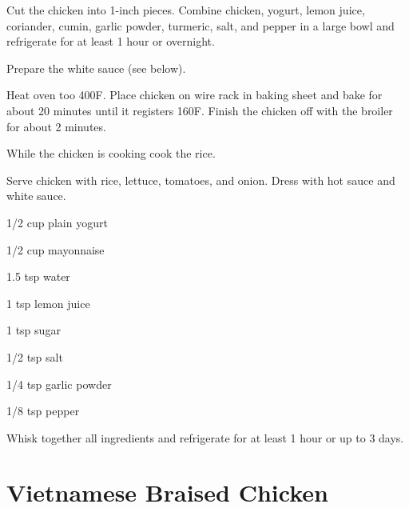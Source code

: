 \documentclass[oneside]{book}  %
\def\thisrecipe{}  %
\newcommand{\recipe}[1]{\section{#1}\def\thisrecipe{: #1}} %
\newcommand{\degF}{\textdegree F\xspace}
\begin{document}
\begin{directions}
  \item Cut the chicken into 1-inch pieces. Combine chicken, yogurt, lemon
  juice, coriander, cumin, garlic powder, turmeric, salt, and pepper in a large
  bowl and refrigerate for at least 1 hour or overnight.

  \item Prepare the white sauce (see below).

  \item Heat oven too 400\degF. Place chicken on wire rack in baking sheet and
  bake for about 20 minutes until it registers 160\degF. Finish the chicken off
  with the broiler for about 2 minutes.

  \item While the chicken is cooking cook the rice.

  \item Serve chicken with rice, lettuce, tomatoes, and onion. Dress with hot
  sauce and white sauce.
\end{directions}

\bigskip

\begin{twocols}
  \begin{ingredients}[title=White Sauce Ingredients]
    \item[1/2 cup] plain yogurt
    \item[1/2 cup] mayonnaise
    \item[1.5 tsp] water
    \item[1 tsp] lemon juice
    \item[1 tsp] sugar
    \item[1/2 tsp] salt
    \item[1/4 tsp] garlic powder
    \item[1/8 tsp] pepper
  \end{ingredients}

  \columnbreak

  \begin{directions1col}
    \item Whisk together all ingredients and refrigerate for at least 1 hour or
    up to 3 days.
  \end{directions1col}
\end{twocols}
\recipe{Vietnamese Braised Chicken} \label{recipe:vietnamese_braised_chicken} %
\end{document}
